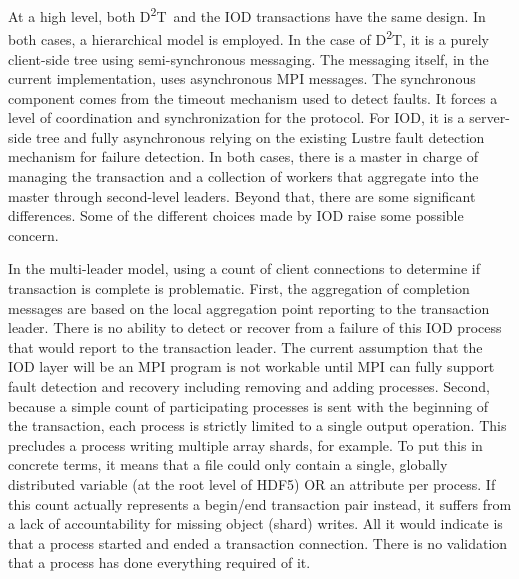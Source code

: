 \documentclass[conference]{IEEEtran}
\newcommand{\DDT}{D\textsuperscript{2}T~}
\newcommand{\DDTns}{D\textsuperscript{2}T}
\begin{document}
At a high level, both \DDT and the IOD transactions have the same design. In
both cases, a hierarchical model is employed. In the case of \DDTns, it is a
purely client-side tree using semi-synchronous messaging. The messaging itself,
in the current implementation, uses asynchronous MPI messages. The synchronous
component comes from the timeout mechanism used to detect faults.  It forces a
level of coordination and synchronization for the protocol. For IOD, it is a
server-side tree and fully asynchronous relying on the existing Lustre fault
detection mechanism for failure detection. In both cases, there is a master in
charge of managing the transaction and a collection of workers that aggregate
into the master through second-level leaders. Beyond that, there are some
significant differences. Some of the different choices made by IOD raise some
possible concern.

In the multi-leader model, using a count of client connections to determine if
transaction is complete is problematic.  First, the aggregation of completion
messages are based on the local aggregation point reporting to the transaction
leader.  There is no ability to detect or recover from a failure of this IOD
process that would report to the transaction leader. The current assumption
that the IOD layer will be an MPI program is not workable until MPI can fully
support fault detection and recovery including removing and adding processes.
Second, because a simple count of participating processes is sent with the
beginning of the transaction, each process is strictly limited to a single
output operation.  This precludes a process writing multiple array shards, for
example. To put this in concrete terms, it means that a file could only contain
a single, globally distributed variable (at the root level of HDF5) OR an
attribute per process. If this count actually represents a begin/end
transaction pair instead, it suffers from a lack of accountability for missing
object (shard) writes. All it would indicate is that a process started and
ended a transaction connection. There is no validation that a process has done
everything required of it.
\end{document}
